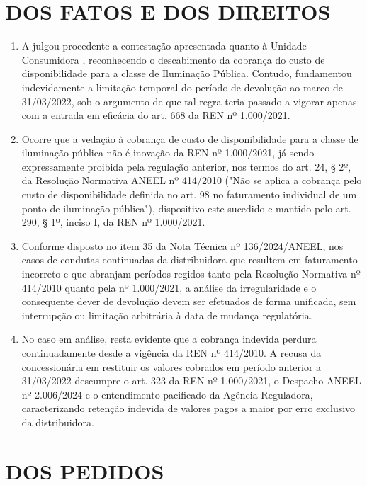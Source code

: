 \newcommand{\tipoRequerimento}{Contestação do marco temporal de devolução e revisão do período faturado}

\section{DOS FATOS E DOS DIREITOS}

\begin{enumerate}[resume]
\item A \nomeConcessionaria{} julgou procedente a contestação apresentada quanto à Unidade Consumidora \unidadeConsumidora{}, reconhecendo o descabimento da cobrança do custo de disponibilidade para a classe de Iluminação Pública. Contudo, fundamentou indevidamente a limitação temporal do período de devolução ao marco de 31/03/2022, sob o argumento de que tal regra teria passado a vigorar apenas com a entrada em eficácia do art. 668 da REN nº 1.000/2021.
\item Ocorre que a vedação à cobrança de custo de disponibilidade para a classe de iluminação pública não é inovação da REN nº 1.000/2021, já sendo expressamente proibida pela regulação anterior, nos termos do art. 24, § 2º, da Resolução Normativa ANEEL nº 414/2010 ("Não se aplica a cobrança pelo custo de disponibilidade definida no art. 98 no faturamento individual de um ponto de iluminação pública"), dispositivo este sucedido e mantido pelo art. 290, § 1º, inciso I, da REN nº 1.000/2021.
\item Conforme disposto no item 35 da Nota Técnica nº 136/2024/ANEEL, nos casos de condutas continuadas da distribuidora que resultem em faturamento incorreto e que abranjam períodos regidos tanto pela Resolução Normativa nº 414/2010 quanto pela nº 1.000/2021, a análise da irregularidade e o consequente dever de devolução devem ser efetuados de forma unificada, sem interrupção ou limitação arbitrária à data de mudança regulatória.
\item No caso em análise, resta evidente que a cobrança indevida perdura continuadamente desde a vigência da REN nº 414/2010. A recusa da concessionária em restituir os valores cobrados em período anterior a 31/03/2022 descumpre o art. 323 da REN nº 1.000/2021, o Despacho ANEEL nº 2.006/2024 e o entendimento pacificado da Agência Reguladora, caracterizando retenção indevida de valores pagos a maior por erro exclusivo da distribuidora.
\end{enumerate}

\section{DOS PEDIDOS}

